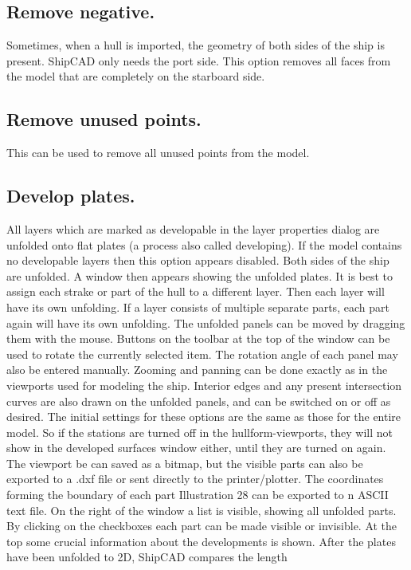 \documentclass[12pt]{article}
\begin{document}
\subsection{Remove negative.}
Sometimes, when a hull is imported, the geometry of both sides of the ship is present. ShipCAD
only needs the port side. This option removes all faces from the model that are completely on the
starboard side.

\subsection{Remove unused points.}
This can be used to remove all unused points from the model.

\subsection{Develop plates.}
All layers which are marked as developable in the layer properties dialog are unfolded onto flat
plates (a process also called developing). If the model contains no developable layers then this
option appears disabled. Both sides of the ship are unfolded. A window then appears showing the
unfolded plates. It is best to assign each strake or part of the hull to a different layer. Then each
layer will have its own unfolding. If a layer consists of multiple separate parts, each part again will
have its own unfolding. The unfolded panels can be moved by dragging them with the mouse.
Buttons on the toolbar at the top of the window can be used to rotate the currently selected item.
The rotation angle of each panel may also be entered manually. Zooming and panning can be done
exactly as in the viewports used for modeling the ship. Interior edges and any present intersection
curves are also drawn on the unfolded panels,
and can be switched on or off as desired. The
initial settings for these options are the same
as those for the entire model. So if the stations
are turned off in the hullform-viewports, they
will not show in the developed surfaces
window either, until they are turned on again.
The viewport be can saved as a bitmap, but
the visible parts can also be exported to a .dxf
file or sent directly to the printer/plotter. The
coordinates forming the boundary of each part
Illustration 28
can be exported to n ASCII text file.
On the right of the window a list is visible, showing all unfolded parts. By clicking on the checkboxes
each part can be made visible or invisible. At the top some crucial information about the
developments is shown. After the plates have been unfolded to 2D, ShipCAD compares the length
\end{document}
